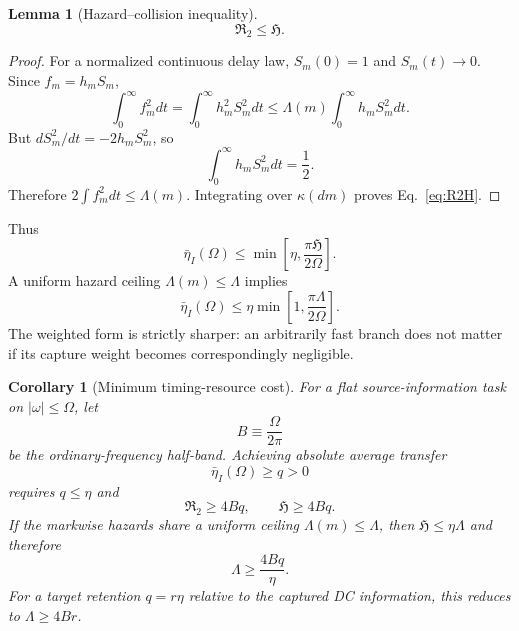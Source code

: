 \documentclass[aps,prapplied,preprint,nofootinbib]{revtex4-2}
\newtheorem{lemma}{Lemma}
\newtheorem{corollary}{Corollary}
\newcommand{\Rtwo}{\mathfrak R_2}
\newcommand{\Hcap}{\mathfrak H}
\begin{document}
\begin{lemma}[Hazard--collision inequality]
\begin{equation}
\boxed{\Rtwo\le\Hcap.}
\label{eq:R2H}
\end{equation}
\end{lemma}

\begin{proof}
For a normalized continuous delay law, $S_m(0)=1$ and $S_m(t)\to0$. Since $f_m=h_mS_m$,
\begin{equation}
\int_0^\infty f_m^2dt
=\int_0^\infty h_m^2S_m^2dt
\le\Lambda(m)\int_0^\infty h_mS_m^2dt.
\end{equation}
But $dS_m^2/dt=-2h_mS_m^2$, so
\begin{equation}
\int_0^\infty h_mS_m^2dt=\frac12.
\end{equation}
Therefore $2\int f_m^2dt\le\Lambda(m)$. Integrating over $\kappa(dm)$ proves Eq.~\eqref{eq:R2H}.
\end{proof}

Thus
\begin{equation}
\boxed{
\bar\eta_I(\Omega)
\le\min\left[\eta,\frac{\pi\Hcap}{2\Omega}\right].}
\label{eq:Hbound}
\end{equation}
A uniform hazard ceiling $\Lambda(m)\le\Lambda$ implies
\begin{equation}
\bar\eta_I(\Omega)\le
\eta\min\left[1,\frac{\pi\Lambda}{2\Omega}\right].
\label{eq:uniformH}
\end{equation}
The weighted form is strictly sharper: an arbitrarily fast branch does not matter if its capture weight becomes correspondingly negligible.

\begin{corollary}[Minimum timing-resource cost]
For a flat source-information task on $|\omega|\le\Omega$, let
\begin{equation}
B\equiv\frac{\Omega}{2\pi}
\end{equation}
be the ordinary-frequency half-band. Achieving absolute average transfer
\begin{equation}
\bar\eta_I(\Omega)\ge q>0
\end{equation}
requires $q\le\eta$ and
\begin{equation}
\boxed{\Rtwo\ge4Bq,\qquad \Hcap\ge4Bq.}
\label{eq:resourceCost}
\end{equation}
If the markwise hazards share a uniform ceiling $\Lambda(m)\le\Lambda$, then $\Hcap\le\eta\Lambda$ and therefore
\begin{equation}
\boxed{\Lambda\ge\frac{4Bq}{\eta}.}
\label{eq:uniformResourceCost}
\end{equation}
For a target retention $q=r\eta$ relative to the captured DC information, this reduces to $\Lambda\ge4Br$.
\end{corollary}
\end{document}
